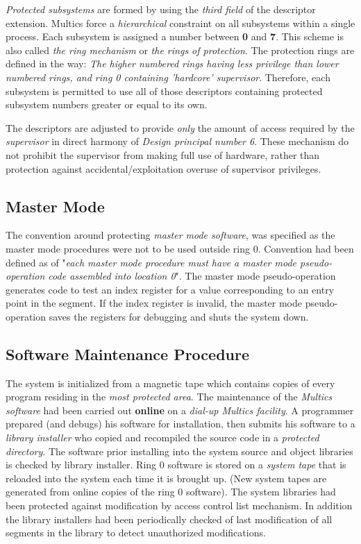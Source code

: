 \textit{Protected subsystems} are formed by using the \textit{third field} of the descriptor extension. Multics force a 
\textit{hierarchical} constraint on all subsystems within a single process. Each subsystem is assigned a number between 
\textbf{0} and \textbf{7}. This scheme is also called \textit{the ring mechanism} or \textit{the rings of protection}. 
The protection rings are defined in the way:
\textit{The higher numbered rings having less privilege than lower numbered rings, and ring 0
containing 'hardcore' supervisor}. Therefore, each subsystem is permitted to use all of those descriptors containing 
protected subsystem numbers greater or equal to its own.

The descriptors are adjusted to provide \textit{only} the amount of access required by the \textit{supervisor} in direct 
harmony of \textit{Design principal number 6}. These mechanism do not prohibit the supervisor from making full use of hardware, 
rather than protection against accidental/exploitation overuse of supervisor privileges.

\subsection{Master Mode}

The convention around protecting \textit{master mode software}, was specified as the master mode procedures
were not to be used outside ring 0. Convention had been defined as of "\textit{each master mode procedure must 
have a master mode pseudo-operation code assembled into location 0}".
The master mode pseudo-operation generates code to test an index register for a value corresponding to an 
entry point in the segment. If the index register is invalid, the master mode pseudo-operation saves the
registers for debugging and shuts the system down.

\subsection{Software Maintenance Procedure}

The system is initialized from a magnetic tape which contains copies of every program residing in the \textit{most protected 
area}. The maintenance of the \textit{Multics software} had been carried out \textbf{online} on a \textit{dial-up 
Multics facility}. A programmer prepared (and debugs) his software for installation, then submits his
software to a \textit{library installer} who copied and recompiled the source code in a \textit{protected 
directory}. 
The software prior installing into the system source and object libraries is checked by library installer.
Ring 0 software is stored on a \textit{system tape} that is reloaded into the system each time it is brought up.
(New system tapes are generated from online copies of the ring 0 software).
The system libraries had been protected against modification by access control list mechanism. In addition 
the library installers had been periodically checked of last modification of all segments in the library to
detect unauthorized modifications.